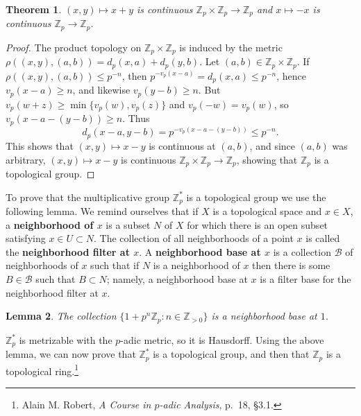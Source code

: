 \documentclass{article}
\newtheorem{theorem}{Theorem}
\newtheorem{lemma}[theorem]{Lemma}
\theoremstyle{definition}
\begin{document}
\begin{theorem}
$(x,y) \mapsto x+y$ is continuous $\mathbb{Z}_p \times \mathbb{Z}_p \to \mathbb{Z}_p$ and $x \mapsto -x$ is continuous
$\mathbb{Z}_p \to \mathbb{Z}_p$. 
\end{theorem}
\begin{proof}
The product topology on $\mathbb{Z}_p \times \mathbb{Z}_p$ is
induced by the metric $\rho((x,y),(a,b))=d_p(x,a)+d_p(y,b)$. 
Let $(a,b) \in \mathbb{Z}_p \times \mathbb{Z}_p$. If $\rho((x,y),(a,b)) \leq p^{-n}$, then
$p^{-v_p(x-a)}=d_p(x,a) \leq p^{-n}$, hence $v_p(x-a) \geq n$, and likewise
$v_p(y-b) \geq n$. But $v_p(w+z) \geq \min\{v_p(w),v_p(z)\}$ and $v_p(-w)=v_p(w)$, so
$v_p(x-a-(y-b)) \geq n$. Thus
\[
d_p(x-a,y-b) = p^{-v_p(x-a-(y-b))} \leq p^{-n}.
\]
This shows that $(x,y) \mapsto x-y$ is continuous at $(a,b)$, and since $(a,b)$ was arbitrary, $(x,y) \mapsto x-y$ is continuous
$\mathbb{Z}_p \times \mathbb{Z}_p \to \mathbb{Z}_p$, showing that $\mathbb{Z}_p$ is a topological group. 
\end{proof}


To prove that the multiplicative group $\mathbb{Z}_p^*$ is a topological group we use the following lemma. We remind ourselves that if $X$ is a topological space and $x \in X$,
a \textbf{neighborhood of $x$} is a subset $N$ of $X$ for which there is an open subset satisfying $x \in U \subset N$. 
The collection of all neighborhoods of a point $x$ is called the
 \textbf{neighborhood filter at $x$}. A \textbf{neighborhood base at $x$} is a collection $\mathscr{B}$ of neighborhoods of $x$ such that if $N$ is a neighborhood of $x$
 then there is some $B \in \mathscr{B}$ such that $B \subset N$; namely, a neighborhood base at $x$ is a filter base for the neighborhood filter
 at $x$. 

\begin{lemma}
The collection $\{1+p^n\mathbb{Z}_p: n \in \mathbb{Z}_{>0}\}$ is a neighborhood base at $1$.
\end{lemma}

$\mathbb{Z}_p^*$ is metrizable with the $p$-adic metric,
so it is Hausdorff.
Using the above lemma, we can now prove that $\mathbb{Z}_p^*$ is a topological group, and then that
$\mathbb{Z}_p$ is a topological ring.\footnote{Alain M. Robert, {\em A Course in $p$-adic Analysis},
p.~18, \S 3.1.}
\end{document}

